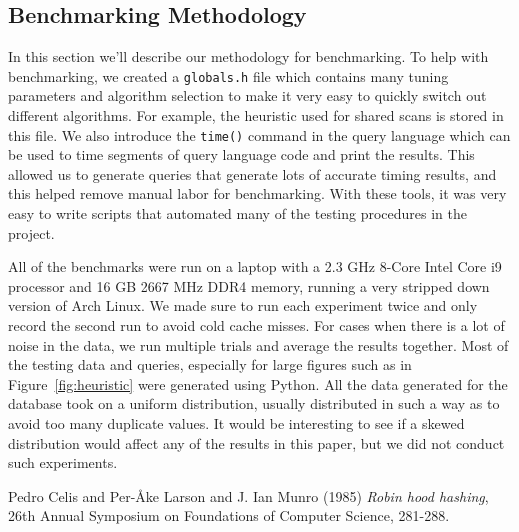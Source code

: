 \documentclass[a4paper, 12pt]{article}
\begin{document}
\subsection{Benchmarking Methodology}

In this section we'll describe our methodology for benchmarking. To help with benchmarking, we created a \texttt{globals.h} file which contains many tuning parameters and algorithm selection to make it very easy to quickly switch out different algorithms. For example, the heuristic used for shared scans is stored in this file. We also introduce the \texttt{time()} command in the query language which can be used to time segments of query language code and print the results. This allowed us to generate queries that generate lots of accurate timing results, and this helped remove manual labor for benchmarking. With these tools, it was very easy to write scripts that automated many of the testing procedures in the project.

\medskip
All of the benchmarks were run on a laptop with a 2.3 GHz 8-Core Intel Core i9 processor and 16 GB 2667 MHz DDR4 memory, running a very stripped down version of Arch Linux. We made sure to run each experiment twice and only record the second run to avoid cold cache misses. For cases when there is a lot of noise in the data, we run multiple trials and average the results together. Most of the testing data and queries, especially for large figures such as in Figure~\ref{fig:heuristic} were generated using Python. All the data generated for the database took on a uniform distribution, usually distributed in such a way as to avoid too many duplicate values. It would be interesting to see if a skewed distribution would affect any of the results in this paper, but we did not conduct such experiments.

\begin{thebibliography}{9}
    Pedro Celis and Per-{\AA}ke Larson and J. Ian Munro (1985) \emph{Robin hood hashing}, 26th Annual Symposium on Foundations of Computer Science, 281-288. 
\end{thebibliography}
\end{document}
